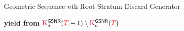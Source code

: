 \begin{algorithm}
\caption{Geometric Sequence $n$th Root Stratum Discard Generator}
\label{alg:geom-seq-nth-root-gen-drop-ranks}
\begin{algorithmic}[1]
    \Ensure{ $\colorTbar \in [0 \twodots \colorT)$ -- data items to drop, if any }
      \State \textbf{yield from} $\colorK^{\mathsf{GSNR}}_a(\colorT - 1) \setminus \colorK^{\mathsf{GSNR}}_a(\colorT)$
    \EndIf
\end{algorithmic}
\end{algorithm}
